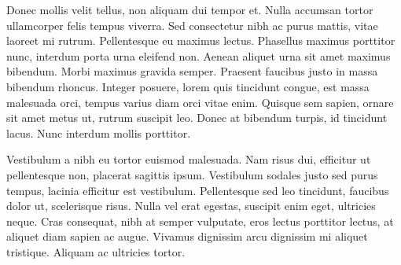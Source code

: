 Donec mollis velit tellus, non aliquam dui tempor et. Nulla accumsan tortor ullamcorper felis tempus viverra. Sed consectetur nibh ac purus mattis, vitae laoreet mi rutrum. Pellentesque eu maximus lectus. Phasellus maximus porttitor nunc, interdum porta urna eleifend non. Aenean aliquet urna sit amet maximus bibendum. Morbi maximus gravida semper. Praesent faucibus justo in massa bibendum rhoncus. Integer posuere, lorem quis tincidunt congue, est massa malesuada orci, tempus varius diam orci vitae enim. Quisque sem sapien, ornare sit amet metus ut, rutrum suscipit leo. Donec at bibendum turpis, id tincidunt lacus. Nunc interdum mollis porttitor.

Vestibulum a nibh eu tortor euismod malesuada. Nam risus dui, efficitur ut pellentesque non, placerat sagittis ipsum. Vestibulum sodales justo sed purus tempus, lacinia efficitur est vestibulum. Pellentesque sed leo tincidunt, faucibus dolor ut, scelerisque risus. Nulla vel erat egestas, suscipit enim eget, ultricies neque. Cras consequat, nibh at semper vulputate, eros lectus porttitor lectus, at aliquet diam sapien ac augue. Vivamus dignissim arcu dignissim mi aliquet tristique. Aliquam ac ultricies tortor.